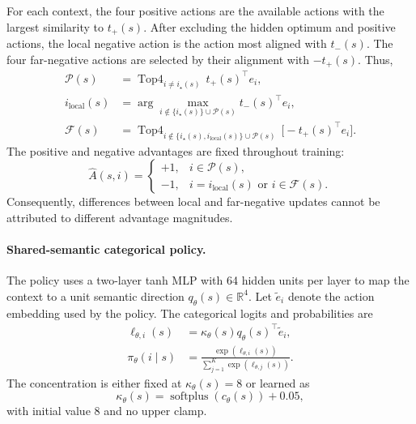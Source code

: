 \documentclass[sigconf,anonymous,review]{acmart}
\theoremstyle{acmdefinition}
\begin{document}
For each context, the four positive actions are the available actions
with the largest similarity to $t_+(s)$. After excluding the hidden
optimum and positive actions, the local negative action is the action
most aligned with $t_-(s)$. The four far-negative actions are selected
by their alignment with $-t_+(s)$. Thus,
\begin{equation}
\begin{aligned}
    \mathcal P(s)
    &=
    \operatorname{Top4}_{i\neq i_\star(s)}
    \,
    t_+(s)^\top e_i, \\
    i_{\mathrm{local}}(s)
    &=
    \arg\max_{i\notin
        \{i_\star(s)\}\cup\mathcal P(s)}
    t_-(s)^\top e_i, \\
    \mathcal F(s)
    &=
    \operatorname{Top4}_{i\notin
        \{i_\star(s),i_{\mathrm{local}}(s)\}
        \cup\mathcal P(s)}
    \,
    \bigl[-t_+(s)^\top e_i\bigr].
\end{aligned}
\label{eq:du1_action_roles}
\end{equation}
The positive and negative advantages are fixed throughout training:
\begin{equation}
    \widehat A(s,i)
    =
    \begin{cases}
        +1,
        & i\in\mathcal P(s),\\
        -1,
        & i=i_{\mathrm{local}}(s)
          \text{ or }i\in\mathcal F(s).
    \end{cases}
    \label{eq:du1_fixed_advantages}
\end{equation}
Consequently, differences between local and far-negative updates cannot
be attributed to different advantage magnitudes.

\paragraph{Shared-semantic categorical policy.}
The policy uses a two-layer tanh MLP with 64 hidden units per layer to
map the context to a unit semantic direction
$q_\theta(s)\in\mathbb R^4$.
Let $\widetilde e_i$ denote the action embedding used by the policy. The
categorical logits and probabilities are
\begin{equation}
\begin{aligned}
    \ell_{\theta,i}(s)
    &=
    \kappa_\theta(s)
    q_\theta(s)^\top
    \widetilde e_i, \\
    \pi_\theta(i\mid s)
    &=
    \frac{
        \exp\!\left(\ell_{\theta,i}(s)\right)
    }{
        \sum_{j=1}^{K}
        \exp\!\left(\ell_{\theta,j}(s)\right)
    }.
\end{aligned}
\label{eq:du1_policy}
\end{equation}
The concentration is either fixed at
$\kappa_\theta(s)=8$
or learned as
\begin{equation}
    \kappa_\theta(s)
    =
    \operatorname{softplus}
    \!\left(
        c_\theta(s)
    \right)
    +
    0.05,
    \label{eq:du1_concentration}
\end{equation}
with initial value 8 and no upper clamp.
\end{document}
